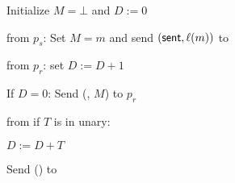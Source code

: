 \begin{bbox}[title={$\mathcal{F}_\msf{Chan}(p_s, p_r)$}]

Initialize $M=\bot$ and $D := 0$

\begin{ritemize}
\item \OnInput {} from $p_s$: Set $M = m$ and send $({\mathsf {sent}}, \ell(m))$ to \A

\item \OnInput {} from $p_r$: set $D := D+1$ 
	
	\quad If $D = 0$: Send (, $M$) to $p_r$

\item \OnInput {} from \A if $T$ is in unary: 
	
		\quad \quad $D := D+T$
		
		\quad \quad Send () to \A	
\end{ritemize}	
\end{bbox}
